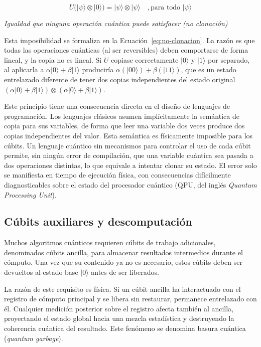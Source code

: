 \begin{equation}
\label{eq:no-clonacion}
U\bigl(|\psi\rangle \otimes |0\rangle\bigr) = |\psi\rangle \otimes |\psi\rangle \quad, \text{para todo } |\psi\rangle
\end{equation}
\begin{center}
\small\textit{Igualdad que ninguna operación cuántica puede satisfacer (no clonación)}
\end{center}
Esta imposibilidad se formaliza en la Ecuación~\ref{eq:no-clonacion}. La razón es que todas las operaciones cuánticas (al ser reversibles) deben comportarse de forma lineal, y la copia no es lineal. Si $U$ copiase correctamente $|0\rangle$ y $|1\rangle$ por separado, al aplicarla a $\alpha|0\rangle + \beta|1\rangle$ produciría $\alpha(|00\rangle) + \beta(|11\rangle)$, que es un estado entrelazado diferente de tener dos copias independientes del estado original $(\alpha|0\rangle + \beta|1\rangle) \otimes (\alpha|0\rangle + \beta|1\rangle)$.

Este principio tiene una consecuencia directa en el diseño de lenguajes de programación. Los lenguajes clásicos asumen implícitamente la semántica de copia para sus variables, de forma que leer una variable dos veces produce dos copias independientes del valor. Esta semántica es físicamente imposible para los cúbits. Un lenguaje cuántico sin mecanismos para controlar el uso de cada cúbit permite, sin ningún error de compilación, que una variable cuántica sea pasada a dos operaciones distintas, lo que equivale a intentar clonar su estado. El error solo se manifiesta en tiempo de ejecución física, con consecuencias difícilmente diagnosticables sobre el estado del procesador cuántico (QPU, del inglés \textit{Quantum Processing Unit}).

\subsection{Cúbits auxiliares y descomputación}
\label{subsec:ancilla}

Muchos algoritmos cuánticos requieren cúbits de trabajo adicionales, denominados cúbits ancilla, para almacenar resultados intermedios durante el cómputo. Una vez que su contenido ya no es necesario, estos cúbits deben ser devueltos al estado base $|0\rangle$ antes de ser liberados.

La razón de este requisito es física. Si un cúbit ancilla ha interactuado con el registro de cómputo principal y se libera sin restaurar, permanece entrelazado con él. Cualquier medición posterior sobre el registro afecta también al ancilla, proyectando el estado global hacia una mezcla estadística y destruyendo la coherencia cuántica del resultado. Este fenómeno se denomina basura cuántica (\textit{quantum garbage}).


